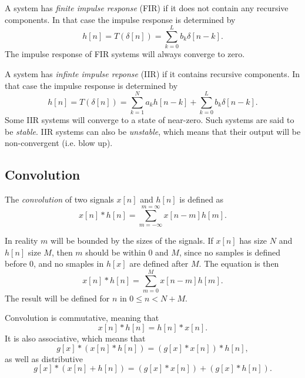 \documentclass{article}
\def\lsqb{\left[}
\def\rsqb{\right]}
\def\sqb#1{\lsqb #1 \rsqb}
\def\xsig{x\sqb{n}}
\begin{document}
A system has \textit{finite impulse response} (FIR) if it does not contain any recursive components. In that case the impulse response is determined by
\begin{equation}
    h\sqb{n} = T(\delta\sqb{n}) = \sum_{k = 0}^L b_k \delta\sqb{n - k}.
\end{equation}
The impulse response of FIR systems will always converge to zero.

A system has \textit{infinte impulse reponse} (IIR) if it contains recursive components. In that case the impulse response is determined by
\begin{equation}
    h\sqb{n} = T(\delta\sqb{n}) = \sum_{k=1}^N a_k h\sqb{n - k} + \sum_{k = 0}^L b_k \delta\sqb{n - k}.
\end{equation}
Some IIR systems will converge to a state of near-zero. Such systems are said to be \textit{stable}. IIR systems can also be \textit{unstable}, which means that their output will be non-convergent (i.e. blow up).

\subsection{Convolution}
The \textit{convolution} of two signals $\xsig$ and $h\sqb{n}$ is defined as
\begin{equation}
    \xsig * h\sqb{n} = \sum_{m = -\infty}^{m = \infty} x\sqb{n - m}h\sqb{m}.
\end{equation}

In reality $m$ will be bounded by the sizes of the signals. If $\xsig$ has size $N$ and $h\sqb{n}$ size $M$, then $m$ should be within $0$ and $M$, since no samples is defined before $0$, and no smaples in $h\sqb{x}$ are defined after $M$. The equation is then
\begin{equation}
    \xsig * h\sqb{n} = \sum_{m = 0}^{M} x\sqb{n - m}h\sqb{m}.
\end{equation}
The result will be defined for $n$ in $0 \leq n < N + M$.

Convolution is commutative, meaning that
\begin{equation}
    \xsig * h\sqb{n} = h\sqb{n} * \xsig.
\end{equation}
It is also associative, which means that
\begin{equation}
    g\sqb{x} * (\xsig * h\sqb{n}) = (g\sqb{x} * \xsig) * h\sqb{n},
\end{equation}
as well as distributive
\begin{equation}
    g\sqb{x} * (\xsig + h\sqb{n}) = (g\sqb{x} * \xsig) + (g\sqb{x} *  h\sqb{n}).
\end{equation}
\end{document}
